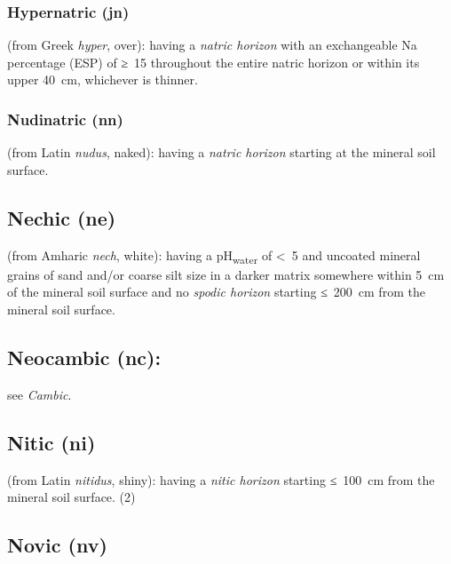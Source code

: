 \documentclass[
  letterpaper,
  DIV=11,
  numbers=noendperiod]{scrreprt}
\begin{document}
\hypertarget{hypernatric-jn-1}{%
\subsubsection{Hypernatric (jn)}\label{hypernatric-jn-1}}

(from Greek \emph{hyper}, over): having a \emph{natric horizon} with an
exchangeable Na percentage (ESP) of ≥~15 throughout the entire natric
horizon or within its upper 40~cm, whichever is thinner.

\hypertarget{nudinatric-nn}{%
\subsubsection{Nudinatric (nn)}\label{nudinatric-nn}}

(from Latin \emph{nudus}, naked): having a \emph{natric horizon}
starting at the mineral soil surface.

\hypertarget{nechic-ne}{%
\subsection{Nechic (ne)}\label{nechic-ne}}

(from Amharic \emph{nech}, white): having a pH\textsubscript{water} of
\textless~5 and uncoated mineral grains of sand and/or coarse silt size
in a darker matrix somewhere within 5~cm of the mineral soil surface and
no \emph{spodic horizon} starting ≤~200~cm from the mineral soil
surface.

\hypertarget{neocambic-nc-1}{%
\subsection{Neocambic (nc):}\label{neocambic-nc-1}}

see \emph{Cambic}.

\hypertarget{nitic-ni}{%
\subsection{Nitic (ni)}\label{nitic-ni}}

(from Latin \emph{nitidus}, shiny): having a \emph{nitic horizon}
starting ≤~100~cm from the mineral soil surface. (2)

\hypertarget{novic-nv}{%
\subsection{Novic (nv)}\label{novic-nv}}
\end{document}
